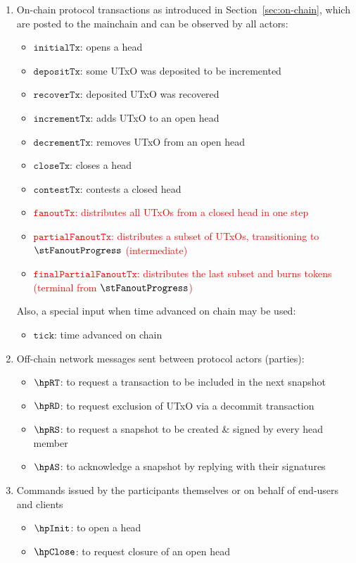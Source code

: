 \begin{enumerate}
	\item On-chain protocol transactions as introduced in
	      Section~\ref{sec:on-chain}, which are posted to the mainchain and can be
	      observed by all actors:
	      \begin{itemize}
		      \item $\mathtt{initialTx}$: opens a head
		      \item $\mathtt{depositTx}$: some UTxO was deposited to be incremented
		      \item $\mathtt{recoverTx}$: deposited UTxO was recovered
		      \item $\mathtt{incrementTx}$: adds UTxO to an open head
		      \item $\mathtt{decrementTx}$: removes UTxO from an open head
		      \item $\mathtt{closeTx}$: closes a head
		      \item $\mathtt{contestTx}$: contests a closed head
		      \item \textcolor{red}{$\mathtt{fanoutTx}$: distributes all UTxOs from a closed head in one step}
		      \item \textcolor{red}{$\mathtt{partialFanoutTx}$: distributes a subset of UTxOs, transitioning to $\stFanoutProgress$ (intermediate)}
		      \item \textcolor{red}{$\mathtt{finalPartialFanoutTx}$: distributes the last subset and burns tokens (terminal from $\stFanoutProgress$)}
	      \end{itemize}
	      Also, a special input when time advanced on chain may be used:
	      \begin{itemize}
		      \item $\mathtt{tick}$: time advanced on chain
	      \end{itemize}

	\item Off-chain network messages sent between protocol actors (parties):
	      \begin{itemize}
		      \item $\hpRT$: to request a transaction to be included in the next snapshot
		      \item $\hpRD$: to request exclusion of UTxO via a decommit transaction
		      \item $\hpRS$: to request a snapshot to be created \& signed by every head member
		      \item $\hpAS$: to acknowledge a snapshot by replying with their signatures
	      \end{itemize}
	\item Commands issued by the participants themselves or on behalf of end-users and clients
	      \begin{itemize}
		      \item $\hpInit$: to open a head
		      \item $\hpClose$: to request closure of an open head
	      \end{itemize}
\end{enumerate}

